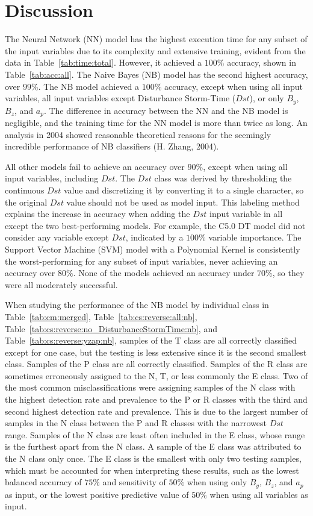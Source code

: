 \documentclass[sn-mathphys-num]{sn-jnl}%
\begin{document}
\section{Discussion}
\label{sec:Discussion}

The Neural Network (NN) model has the highest execution time for any subset of the input variables due to its complexity and extensive training, evident from the data in Table~\ref{tab:time:total}. However, it achieved a $100\%$ accuracy, shown in Table~\ref{tab:acc:all}. The Naive Bayes (NB) model has the second highest accuracy, over $99\%$. The NB model achieved a $100\%$ accuracy, except when using all input variables, all input variables except Disturbance Storm-Time ($Dst$), or only $B_{y}$, $B_{z}$, and $a_{p}$. The difference in accuracy between the NN and the NB model is negligible, and the training time for the NN model is more than twice as long. An analysis in 2004 showed reasonable theoretical reasons for the seemingly incredible performance of NB classifiers (H. Zhang, 2004).

All other models fail to achieve an accuracy over $90\%$, except when using all input variables, including $Dst$. The $Dst$ class was derived by thresholding the continuous $Dst$ value and discretizing it by converting it to a single character, so the original $Dst$ value should not be used as model input. This labeling method explains the increase in accuracy when adding the $Dst$ input variable in all except the two best-performing models. For example, the C5.0 DT model did not consider any variable except $Dst$, indicated by a $100\%$ variable importance. The Support Vector Machine (SVM) model with a Polynomial Kernel is consistently the worst-performing for any subset of input variables, never achieving an accuracy over $80\%$. None of the models achieved an accuracy under $70\%$, so they were all moderately successful.

When studying the performance of the NB model by individual class in Table~\ref{tab:cm:merged}, Table~\ref{tab:cs:reverse:all:nb}, Table~\ref{tab:cs:reverse:no_DisturbanceStormTime:nb}, and Table~\ref{tab:cs:reverse:yzap:nb}, samples of the T class are all correctly classified except for one case, but the testing is less extensive since it is the second smallest class. Samples of the P class are all correctly classified. Samples of the R class are sometimes erroneously assigned to the N, T, or less commonly the E class. Two of the most common misclassifications were assigning samples of the N class with the highest detection rate and prevalence to the P or R classes with the third and second highest detection rate and prevalence. This is due to the largest number of samples in the N class between the P and R classes with the narrowest $Dst$ range. Samples of the N class are least often included in the E class, whose range is the furthest apart from the N class. A sample of the E class was attributed to the N class only once. The E class is the smallest with only two testing samples, which must be accounted for when interpreting these results, such as the lowest balanced accuracy of $75\%$ and sensitivity of $50\%$ when using only $B_{y}$, $B_{z}$, and $a_{p}$ as input, or the lowest positive predictive value of $50\%$ when using all variables as input.
\end{document}
